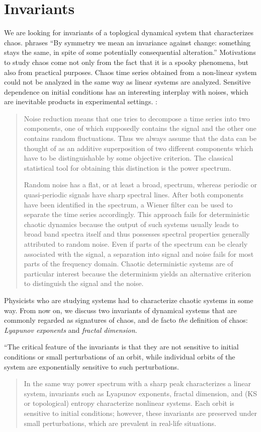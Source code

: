 \documentclass[12pt,twoside]{book}
\begin{document}
\section{Invariants}
We are looking for invariants of a toplogical dynamical system that characterizes chaos.
\citet[p.xiii-xv]{schroeder} phrases
``By symmetry we mean an invariance against change: something stays the same, in spite of some potentially consequential alteration.''
Motivations to study chaos come not only from the fact that it is a spooky phenomena, but also from practical purposes.
Chaos time series obtained from a non-linear system could not be analyzed in the same way as linear systems are analyzed.
Sensitive dependence on initial conditions has an interesting interplay with noises, which are inevitable products in experimental settings.
\citet[p.51]{kantz-schreiber}:
\begin{quotation}
  Noise reduction means that one tries to decompose a time series into two components, one of which supposedly contains the signal and the other one contains random fluctuations.
  Thus we always assume that the data can be thought of as an additive superposition of two different components which have to be distinguishable by some objective criterion.
  The classical statistical tool for obtaining this distinction is the power spectrum.

  Random noise has a flat, or at least a broad, spectrum, whereas periodic or quasi-periodic signals have sharp spectral lines.
  After both components have been identified in the spectrum, a Wiener filter can be used to separate the time series accordingly.
  This approach fails for deterministic chaotic dynamics because the output of such systems usually leads to broad band spectra itself and thus possesses spectral properties generally attributed to random noise.
  Even if parts of the spectrum can be clearly associated with the signal, a separation into signal and noise fails for most parts of the frequency domain.
  Chaotic deterministic systems are of particular interest because the determinism yields an alternative criterion to distinguish the signal and the noise. 
\end{quotation}
Physicists who are studying systems had to characterize chaotic systems in some way.
From now on, we discuss two invariants of dynamical systems that are commonly regarded as signatures of chaos, and de facto \textit{the} definition of chaos: \textit{Lyapunov exponents} and \textit{fractal dimension}.


``The critical feature of the invariants is that they are not sensitive to initial conditions
or small perturbations of an orbit, while individual orbits of the system are exponentially
sensitive to such perturbations. \citep[p.1334]{abarbanel}
\begin{quote}
  In the same way power spectrum with a sharp peak characterizes a linear system, invariants such as Lyapunov exponents, fractal dimension, and (KS or topological) entropy characterize nonlinear systems.
  Each orbit is sensitive to initial conditions; however, these invariants are preserved under small perturbations, which are prevalent in real-life situations.
\end{quote}
\end{document}
